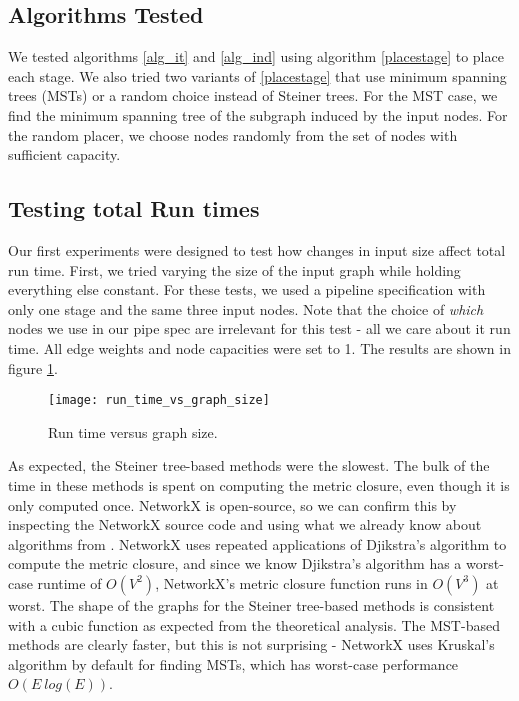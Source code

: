 \documentclass{acmart}
\begin{document}
	\subsection{Algorithms Tested}
	We tested algorithms \ref{alg_it} and \ref{alg_ind} using algorithm \ref{placestage} to place each stage. We also tried two variants of \ref{placestage} that use minimum spanning trees (MSTs) or a random choice instead of Steiner trees. For the MST case, we find the minimum spanning tree of the subgraph induced by the input nodes. For the random placer, we choose nodes randomly from the set of nodes with sufficient capacity.
	
	\subsection{Testing total Run times}
	Our first experiments were designed to test how changes in input size affect total run time. First, we tried varying the size of the input graph while holding everything else constant. For these tests, we used a pipeline specification with only one stage and the same three input nodes. Note that the choice of \textit{which} nodes we use in our pipe spec are irrelevant for this test - all we care about it run time. All edge weights and node capacities were set to 1. The results are shown in figure \ref{fig:rt_gs}.
	\begin{figure}[H]
	    \centering
	    \texttt{[image: run\_time\_vs\_graph\_size]}
	    \caption{Run time versus graph size.}
	    \label{fig:rt_gs}
	\end{figure}
	As expected, the Steiner tree-based methods were the slowest. The bulk of the time in these methods is spent on computing the metric closure, even though it is only computed once. NetworkX is open-source, so we can confirm this by inspecting the NetworkX source code and using what we already know about algorithms from \cite{Cormen09introductionto}. NetworkX uses repeated applications of Djikstra's algorithm to compute the metric closure, and since we know Djikstra's algorithm has a worst-case runtime of $O(V^{2})$, NetworkX's metric closure function runs in $O(V^{3})$ at worst. The shape of the graphs for the Steiner tree-based methods is consistent with a cubic function as expected from the theoretical analysis. The MST-based methods are clearly faster, but this is not surprising - NetworkX uses Kruskal's algorithm by default for finding MSTs, which has worst-case performance $O(E\ log(E))$.
	
\end{document}
